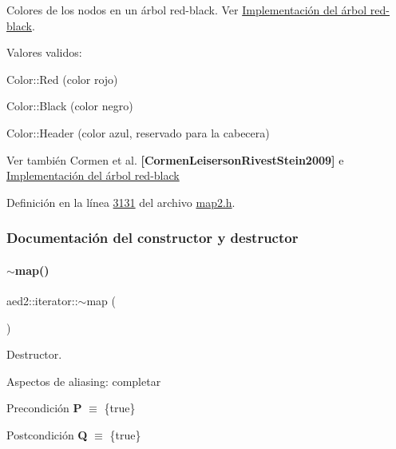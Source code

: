 Colores de los nodos en un árbol red-\/black. Ver \hyperlink{Implementacion}{Implementación del árbol red-\/black}. 

Valores validos\+: \begin{DoxyItemize}
\item Color\+::\+Red (color rojo) \item Color\+::\+Black (color negro) \item Color\+::\+Header (color azul, reservado para la cabecera)\end{DoxyItemize}
\begin{DoxySeeAlso}{Ver también}
Cormen et al. {\bfseries [Cormen\+Leiserson\+Rivest\+Stein2009]} e \hyperlink{Implementacion}{Implementación del árbol red-\/black} 
\end{DoxySeeAlso}


Definición en la línea \hyperlink{map2_8h_source_l03131}{3131} del archivo \hyperlink{map2_8h_source}{map2.\+h}.



\subsubsection{Documentación del constructor y destructor}
\mbox{\label{classaed2_1_1iterator_a769d0ae1a1c7ed66acdd321e44fcd0e1_a769d0ae1a1c7ed66acdd321e44fcd0e1}} 
\paragraph{\texorpdfstring{$\sim$map()}{~map()}}
{\footnotesize\ttfamily aed2\+::iterator\+::$\sim$map (\begin{DoxyParamCaption}{ }\end{DoxyParamCaption})\hspace{0.3cm}{\ttfamily [inline]}}



Destructor. 

\begin{DoxyParagraph}{Aspectos de aliasing\+:}
completar
\end{DoxyParagraph}
\begin{DoxyPrecond}{Precondición}
{\bfseries P} $\equiv$ \{true\} 
\end{DoxyPrecond}
\begin{DoxyPostcond}{Postcondición}
{\bfseries Q} $\equiv$ \{true\}
\end{DoxyPostcond}

